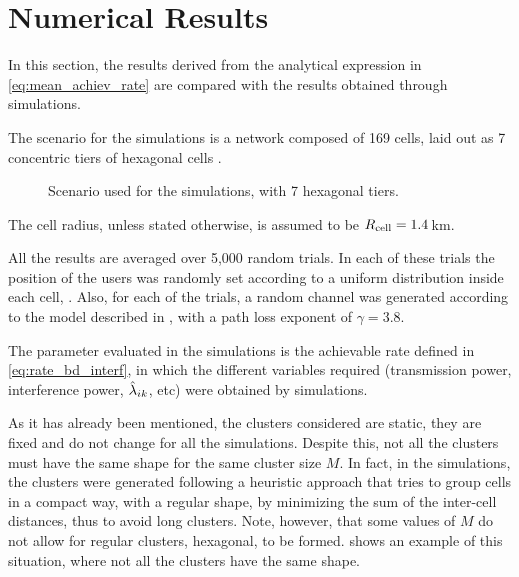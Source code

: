 \section{Numerical Results}\label{sec:achiev_numerical}

In this section, the results derived from the analytical expression in
\eqref{eq:mean_achiev_rate} are compared with the results obtained through
simulations.

The scenario for the simulations is a network composed of 169 cells, laid out as
7 concentric tiers of hexagonal cells .

\begin{figure}[t]
\begin{center}
    \dummybox
\end{center}
\caption{Scenario used for the simulations, with 7 hexagonal tiers.}
\label{fig:simulation_scenario_achiev}
\end{figure}

The cell radius, unless stated otherwise, is assumed to be $R_{\text{cell}}=1.4$\,km.

All the results are averaged over 5,000 random trials. In each of these trials
the position of the users was randomly set according to a uniform distribution
inside each cell, . Also, for each of the trials, a
random channel was generated according to the model described in
, with a path loss exponent of $\gamma=3.8$.

The parameter evaluated in the simulations is the achievable rate defined in
\eqref{eq:rate_bd_interf}, in which the different variables required
(transmission power, interference power, $\hat{\lambda}_{ik}$, etc) were obtained
by simulations.

As it has already been mentioned, the clusters considered are static,
\ie they are fixed and do not change for all the simulations. Despite
this, not all the clusters must have the same shape for the same cluster size
$M$. In fact, in the simulations, the clusters were generated following a
heuristic approach that tries to group cells in a compact way, with a regular
shape, by minimizing the sum of the inter-cell distances, thus to avoid long
clusters. Note, however, that some values of $M$ do not allow for regular
clusters, \ie hexagonal, to be formed. 
shows an example of this situation, where not all the clusters have the same
shape.

